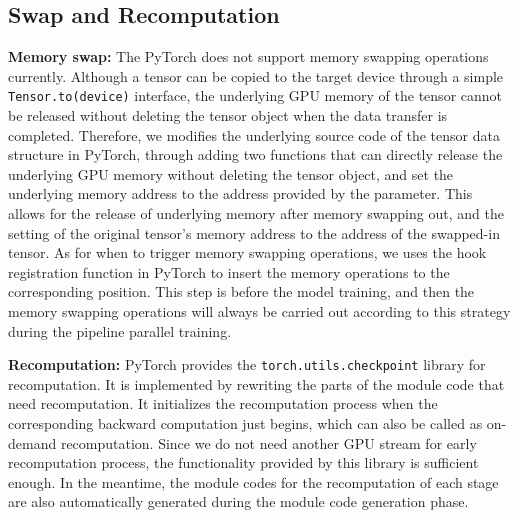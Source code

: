 \subsection{Swap and Recomputation}
\textbf{Memory swap:} The PyTorch does not support memory swapping operations currently.
Although a tensor can be copied to the target device through
a simple \texttt{Tensor.to(device)} interface,
the underlying GPU memory of the tensor cannot be released
without deleting the tensor object when the data transfer is completed.
Therefore, we modifies the underlying source code of the tensor data structure in PyTorch,
through adding two functions that can directly release the underlying
GPU memory without deleting the tensor object,
and set the underlying memory address to the address provided by the parameter.
This allows for the release of underlying memory after memory swapping out,
and the setting of the original tensor's memory address to
the address of the swapped-in tensor.
As for when to trigger memory swapping operations,
we uses the hook registration function in PyTorch to insert
the memory operations to the corresponding position.
This step is before the model training,
and then the memory swapping operations will always be carried out
according to this strategy during the pipeline parallel training.

\textbf{Recomputation:} PyTorch provides
the \texttt{torch.utils.checkpoint} library for recomputation.
It is implemented by rewriting the parts of the module code that need recomputation.
It initializes the recomputation process when the corresponding backward computation just begins,
which can also be called as on-demand recomputation.
Since we do not need another GPU stream for early recomputation process,
the functionality provided by this library is sufficient enough.
In the meantime,
the module codes for the recomputation of each stage are
also automatically generated during the module code generation phase.
